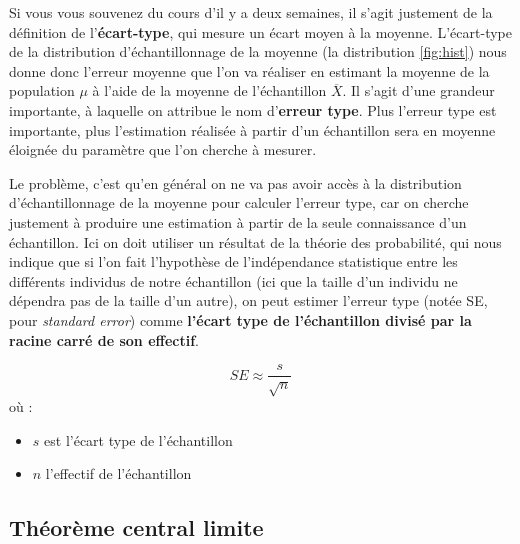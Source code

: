 \documentclass[
  french,
]{book}
\providecommand{\tightlist}{%
  \setlength{\itemsep}{0pt}\setlength{\parskip}{0pt}}
\begin{document}
Si vous vous souvenez du cours d'il y a deux semaines, il s'agit justement de la définition de l'\textbf{écart-type}, qui mesure un écart moyen à la moyenne. L'écart-type de la distribution d'échantillonnage de la moyenne (la distribution \ref{fig:hist}) nous donne donc l'erreur moyenne que l'on va réaliser en estimant la moyenne de la population \(\mu\) à l'aide de la moyenne de l'échantillon \(\overline{X}\). Il s'agit d'une grandeur importante, à laquelle on attribue le nom d'\textbf{erreur type}. Plus l'erreur type est importante, plus l'estimation réalisée à partir d'un échantillon sera en moyenne éloignée du paramètre que l'on cherche à mesurer.

Le problème, c'est qu'en général on ne va pas avoir accès à la distribution d'échantillonnage de la moyenne pour calculer l'erreur type, car on cherche justement à produire une estimation à partir de la seule connaissance d'un échantillon. Ici on doit utiliser un résultat de la théorie des probabilité, qui nous indique que si l'on fait l'hypothèse de l'indépendance statistique entre les différents individus de notre échantillon (ici que la taille d'un individu ne dépendra pas de la taille d'un autre), on peut estimer l'erreur type (notée SE, pour \emph{standard error}) comme \textbf{l'écart type de l'échantillon divisé par la racine carré de son effectif}.

\[ SE \approx \frac{s}{\sqrt{n}} \] où :

\begin{itemize}
\tightlist
\item
  \(s\) est l'écart type de l'échantillon
\item
  \(n\) l'effectif de l'échantillon
\end{itemize}

\hypertarget{thuxe9oruxe8me-central-limite}{%
\subsection{Théorème central limite}\label{thuxe9oruxe8me-central-limite}}
\end{document}
